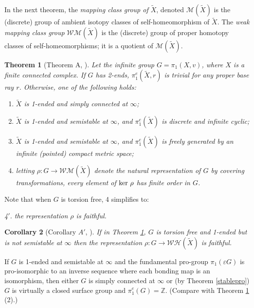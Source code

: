 \documentclass[12pt]{article}
\newtheorem{theorem}{Theorem}[subsection]
\newtheorem{corollary}[theorem]{Corollary}
\begin{document}
In the next theorem, the {\it mapping class group of $\tilde X$}, denoted $\mathcal M(\tilde X)$ is the (discrete) group of ambient isotopy classes of self-homeomorphism of $\tilde X$. The {\it weak mapping class group}  $\mathcal W \mathcal M(\tilde X)$ is the (discrete) group of proper homotopy classes of self-homeomorphisms; it is a quotient of $\mathcal M(\tilde X)$.  

\begin{theorem} [Theorem A, \cite{GM96}] \label{fginf}  
Let the infinite group $G=\pi_1(X,v)$, where $X$ is a finite connected complex. If $G$ has 2-ends, $\pi_1^e(\tilde X,r)$ is trivial for any proper base ray $r$. Otherwise, one of the following holds: 
\begin{enumerate} 
\item $\tilde X$ is 1-ended and simply connected at $\infty$;
\item $\tilde X$ is 1-ended and semistable at $\infty$, and $\pi_1^e(\tilde X)$ is discrete and infinite cyclic;
\item $\tilde X$ is 1-ended and semistable at $\infty$, and $\pi_1^e(\tilde X)$ is freely generated by an infinite (pointed) compact metric space;
\item letting $\rho:G\to \mathcal{WM} (\tilde X)$ denote the natural representation of $G$ by covering transformations, every element of $\hbox{ker }\rho$ has finite order in $G$. 
\end{enumerate}

\end{theorem}

Note that when $G$ is torsion free, 4 simplifies to:

 \medskip
 
{\it 4$'$. the representation $\rho$ is faithful.} 

\begin{corollary} [Corollary $A'$, \cite{GM96}] 
If in Theorem \ref{fginf}, $G$ is torsion free and 1-ended but is not semistable at $\infty$ then the representation $\rho:G\to \mathcal {WH}(\tilde X)$ is faithful.
\end{corollary}

If $G$ is 1-ended and semistable at $\infty$ and the fundamental pro-group $\pi_1(\varepsilon G)$ is pro-isomorphic to an inverse sequence where each bonding map is an isomorphism, then either $G$ is simply connected at $\infty$ or (by Theorem \ref{stablepro}) $G$ is virtually a closed surface group and $\pi
_{1}^{e}(G)=\mathbb{Z}$. (Compare with Theorem \ref{fginf} (2).)
\end{document}
